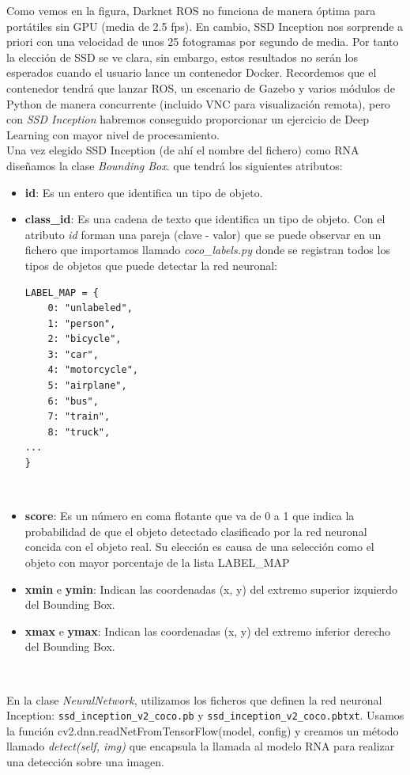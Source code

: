 Como vemos en la figura, Darknet ROS no funciona de manera óptima para portátiles sin GPU (media de 2.5 fps). En cambio, SSD Inception nos sorprende a priori con una velocidad de unos 25 fotogramas por segundo de media. Por tanto la elección de SSD se ve clara, sin embargo, estos resultados no serán los esperados cuando el usuario lance un contenedor Docker. Recordemos que el contenedor tendrá que lanzar ROS, un escenario de Gazebo y varios módulos de Python de manera concurrente (incluido VNC para visualización remota), pero con \textit{SSD Inception} habremos conseguido proporcionar un ejercicio de Deep Learning con mayor nivel de procesamiento.\\

Una vez elegido SSD Inception (de ahí el nombre del fichero) como RNA diseñamos la clase \textit{Bounding Box}. que tendrá los siguientes atributos:

\begin{itemize}
	\item \textbf{id}: Es un entero que identifica un tipo de objeto.
	\item \textbf{class\_id}: Es una cadena de texto que identifica un tipo de objeto. Con el atributo \textit{id} forman una pareja (clave - valor) que se puede observar en un fichero que importamos llamado \textit{coco\_labels.py} donde se registran todos los tipos de objetos que puede detectar la red neuronal:\\
\begin{lstlisting}
LABEL_MAP = {
    0: "unlabeled",
    1: "person",
    2: "bicycle",
    3: "car",
    4: "motorcycle",
    5: "airplane",
    6: "bus",
    7: "train",
    8: "truck",
...
}
\end{lstlisting}\
	\item \textbf{score}: Es un número en coma flotante que va de 0 a 1 que indica la probabilidad de que el objeto detectado clasificado por la red neuronal concida con el objeto real. Su elección es causa de una selección como el objeto con mayor porcentaje de la lista LABEL\_MAP
	\item \textbf{xmin} e \textbf{ymin}: Indican las coordenadas (x, y) del extremo superior izquierdo del Bounding Box.
	\item \textbf{xmax} e \textbf{ymax}: Indican las coordenadas (x, y) del extremo inferior derecho del Bounding Box.
\end{itemize}\

En la clase \textit{NeuralNetwork}, utilizamos los ficheros que definen la red neuronal Inception: \texttt{ssd\_inception\_v2\_coco.pb} y \texttt{ssd\_inception\_v2\_coco.pbtxt}. Usamos la función cv2.dnn.readNetFromTensorFlow(model, config) y creamos un método llamado \textit{detect(self, img)} que encapsula la llamada al modelo RNA para realizar una detección sobre una imagen.\\

